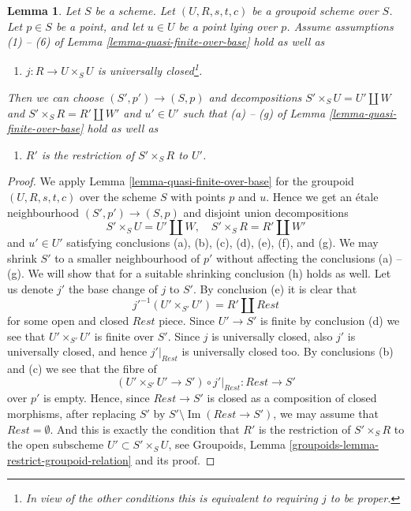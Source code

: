 \documentclass{stacks-project}
\theoremstyle{plain}
\newtheorem{lemma}[subsection]{Lemma}
\theoremstyle{definition}
\theoremstyle{remark}
\numberwithin{equation}{subsection}
\def\Im{\mathop{\mathrm{Im}}}
\begin{document}
\begin{lemma}
\label{lemma-quasi-finite-over-base-j-proper}
Let $S$ be a scheme.
Let $(U, R, s, t, c)$ be a groupoid scheme over $S$.
Let $p \in S$ be a point, and let $u \in U$ be a point lying over $p$.
Assume assumptions (1) -- (6) of
Lemma \ref{lemma-quasi-finite-over-base}
hold as well as
\begin{enumerate}
\item[(7)] $j : R \to U \times_S U$ is universally closed\footnote{In view of
the other conditions this is equivalent to requiring $j$ to be proper.}.
\end{enumerate}
Then we can choose $(S', p') \to (S, p)$ and decompositions
$S' \times_S U = U' \amalg W$ and $S' \times_S R = R' \amalg W'$
and $u' \in U'$ such that (a) -- (g) of
Lemma \ref{lemma-quasi-finite-over-base}
hold as well as
\begin{enumerate}
\item[(h)] $R'$ is the restriction of $S' \times_S R$ to $U'$.
\end{enumerate}
\end{lemma}

\begin{proof}
We apply Lemma \ref{lemma-quasi-finite-over-base} for the
groupoid $(U, R, s, t, c)$ over the scheme $S$ with points $p$ and $u$.
Hence we get an \'etale neighbourhood
$(S', p') \to (S, p)$ and disjoint union decompositions
$$
S' \times_S U = U' \amalg W, \quad
S' \times_S R = R' \amalg W'
$$
and $u' \in U'$ satisfying conclusions (a), (b), (c), (d), (e), (f), and (g).
We may shrink $S'$ to a smaller neighbourhood of $p'$ without
affecting the conclusions (a) -- (g). We will show that for a suitable
shrinking conclusion (h) holds as well.
Let us denote $j'$ the base change of $j$ to $S'$.
By conclusion (e) it is clear that
$$
j'^{-1}(U' \times_{S'} U') = R' \amalg Rest
$$
for some open and closed $Rest$ piece. Since $U' \to S'$ is finite
by conclusion (d) we see that $U' \times_{S'} U'$ is finite over $S'$.
Since $j$ is universally closed, also $j'$ is universally closed, and
hence $j'|_{Rest}$ is universally closed too. By conclusions
(b) and (c) we see that the fibre of
$$
(U' \times_{S'} U' \to S') \circ j'|_{Rest} :
Rest
\longrightarrow
S'
$$
over $p'$ is empty. Hence, since $Rest \to S'$ is closed as a composition
of closed morphisms, after replacing $S'$ by
$S' \setminus \Im(Rest \to S')$, we may assume that
$Rest = \emptyset$. And this is exactly the condition that $R'$ is
the restriction of $S' \times_S R$ to the open subscheme
$U' \subset S' \times_S U$, see
Groupoids, Lemma \ref{groupoids-lemma-restrict-groupoid-relation}
and its proof.
\end{proof}
\end{document}
